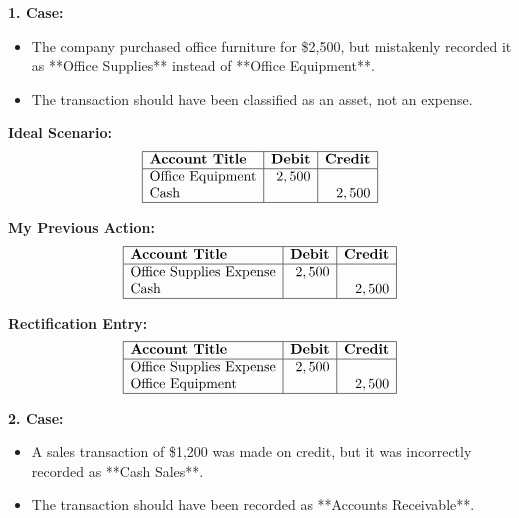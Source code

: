 \documentclass[12pt,a4paper]{book}
\begin{document}
\textbf{1. Case:}
\begin{itemize}
    \item The company purchased office furniture for \$2,500, but mistakenly recorded it as **Office Supplies** instead of **Office Equipment**.
    \item The transaction should have been classified as an asset, not an expense.
\end{itemize}
\begin{multicols}{2}
    
    \textbf{Ideal Scenario:}
    \[
    \begin{array}{|l|r|r|}
        \hline
        \textbf{Account Title} & \textbf{Debit} & \textbf{Credit} \\
        \hline
        \text{Office Equipment} & 2,500 & \\
        \text{Cash} & & 2,500 \\
        \hline
    \end{array}
    \]
    
    \textbf{My Previous Action:}
\[
\begin{array}{|l|r|r|}
\hline
\textbf{Account Title} & \textbf{Debit} & \textbf{Credit} \\
\hline
\text{Office Supplies Expense} & 2,500 & \\
\text{Cash} & & 2,500 \\
\hline
\end{array}
\]
\end{multicols}

\textbf{Rectification Entry:}
\[
\begin{array}{|l|r|r|}
\hline
\textbf{Account Title} & \textbf{Debit} & \textbf{Credit} \\
\hline
\text{Office Supplies Expense} & 2,500 & \\
\text{Office Equipment} & & 2,500 \\
\hline
\end{array}
\]

\vspace{0.5cm}

\textbf{2. Case:}
\begin{itemize}
    \item A sales transaction of \$1,200 was made on credit, but it was incorrectly recorded as **Cash Sales**.
    \item The transaction should have been recorded as **Accounts Receivable**.
\end{itemize}
\end{document}
